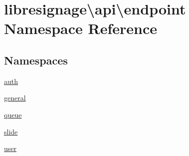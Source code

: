 \hypertarget{namespacelibresignage_1_1api_1_1endpoint}{}\section{libresignage\textbackslash{}api\textbackslash{}endpoint Namespace Reference}
\label{namespacelibresignage_1_1api_1_1endpoint}
\subsection*{Namespaces}
\begin{DoxyCompactItemize}
\item 
 \hyperlink{namespacelibresignage_1_1api_1_1endpoint_1_1auth}{auth}
\item 
 \hyperlink{namespacelibresignage_1_1api_1_1endpoint_1_1general}{general}
\item 
 \hyperlink{namespacelibresignage_1_1api_1_1endpoint_1_1queue}{queue}
\item 
 \hyperlink{namespacelibresignage_1_1api_1_1endpoint_1_1slide}{slide}
\item 
 \hyperlink{namespacelibresignage_1_1api_1_1endpoint_1_1user}{user}
\end{DoxyCompactItemize}
